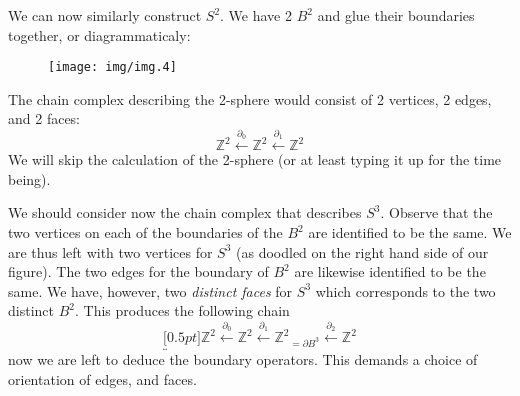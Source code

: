 We can now similarly construct $S^{2}$. We have 2 $B^{2}$ and glue their
boundaries together, or diagrammaticaly:
\begin{figure}[H]
\begin{center}
\texttt{[image: img/img.4]}
\end{center}
\end{figure}
\noindent The chain complex describing the 2-sphere would consist
of 2 vertices, 2 edges, and 2 faces:
\begin{equation}%
\mathbb{Z}^{2}\xleftarrow{\partial_{0}}\mathbb{Z}^{2}\xleftarrow{\partial_{1}}\mathbb{Z}^{2}
\end{equation}
We will skip the calculation of the 2-sphere (or at least typing
it up for the time being).

We should consider now the chain complex that describes
$S^{3}$. Observe that the two vertices on each of the boundaries
of the $B^{2}$ are identified to be the same. We are thus left
with two vertices for $S^{3}$ (as doodled on the right hand side
of our figure). The two edges for the boundary of $B^{2}$ are
likewise identified to be the same. We have, however, two
\emph{distinct faces} for $S^{3}$ which corresponds to the two
distinct $B^{2}$. This produces the following chain
\begin{equation}%
\underbracket[0.5pt]{\mathbb{Z}^{2}\xleftarrow{\partial_{0}}\mathbb{Z}^{2}\xleftarrow{\partial_{1}}\mathbb{Z}^{2}}_{=\partial{B^{3}}}\xleftarrow{\partial_{2}}\mathbb{Z}^{2}
\end{equation}
now we are left to deduce the boundary operators. This demands a
choice of orientation of edges, and faces. 
 
